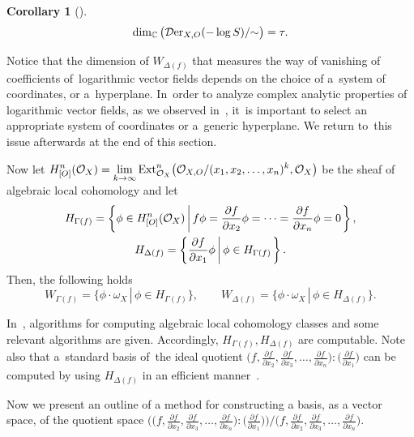 \documentclass[10pt,a4paper]{amsart}
\numberwithin{equation}{section}
\newtheorem{Corollary}[Theorem]{Corollary}
\newcommand{\Set}[1]{\left\{#1\right\}}
\newcommand{\setDef}[2]{{#1}\left|\,\vphantom{#1}{#2}\right.}%
\newcommand{\SetDef}[2]{\Set{\setDef{#1}{#2}}}
\begin{document}
\begin{Corollary}[\cite{T}]
\[
\dim_{{\mathbb C}}\big({\mathcal D}{\rm er}_{X, O}(-\log S)/{\sim}\big) = \tau.
\]
\end{Corollary}

Notice that the dimension of $W_{\Delta(f)}$ that measures the way of vanishing of coefficients of~loga\-rithmic vector fields depends on the choice of a~system of coordinates, or a~hyperplane. In~order to analyze complex analytic properties of logarithmic vector fields, as we observed in~\cite{T}, it~is important to select an appropriate system of coordinates or a~generic hyperplane. We return to~this issue afterwards at the end of this section.


Now let
$\displaystyle H_{[O]}^n({\mathcal O}_X) = \lim_{k \to \infty} {\rm Ext}_{{\mathcal O}_X}^n \big({\mathcal O}_{X,O}/(x_1,x_2,\ldots,x_n)^k, {\mathcal O}_X\big)$
be the sheaf of algebraic local cohomology and let
\begin{gather*}
H_{\Gamma(f)} = \SetDef{ \phi \in H_{[O]}^n({\mathcal O}_X) }{f\phi = \frac{\partial f}{\partial x_2}\phi = \cdots = \frac{\partial f}{\partial x_{n}}\phi = 0},
\\
H_{\Delta(f)} = \SetDef{\frac{\partial f}{\partial x_1}\phi}{\phi\in H_{\Gamma(f)}}.
\end{gather*}
Then, the following holds
\[
W_{\Gamma(f)} = \{\phi \cdot \omega_X \,|\, \phi \in H_{\Gamma(f)}\}, \qquad
W_{\Delta(f)} = \{\phi \cdot \omega_X \,|\, \phi \in H_{\Delta(f)}\}.
\]

In~\cite{TNN}, algorithms for computing algebraic local cohomology classes and some relevant algo\-rithms are given.
Accordingly, $ H_{\Gamma(f)}, H_{\Delta(f)} $ are computable. Note also that a~standard basis of~the ideal quotient
$\big(f, \frac{\partial f}{\partial x_2}, \frac{\partial f}{\partial x_3},\ldots,
\frac{\partial f}{\partial x_{n}}\big) : \big(\frac{\partial f}{\partial x_1}\big)$ can be computed by using $ H_{\Delta(f)} $ in an efficient manner~\cite{TNN}.


Now we present an outline of a method for constructing a basis, as a vector space, of the quotient space
$\big(\big(f, \frac{\partial f}{\partial x_2}, \frac{\partial f}{\partial x_3},\ldots,
\frac{\partial f}{\partial x_{n}}\big) : \big(\frac{\partial f}{\partial x_1}\big)\big)/\big(f, \frac{\partial f}{\partial x_2}, \frac{\partial f}{\partial x_3},\ldots,
\frac{\partial f}{\partial x_{n}}\big)$.
\end{document}
